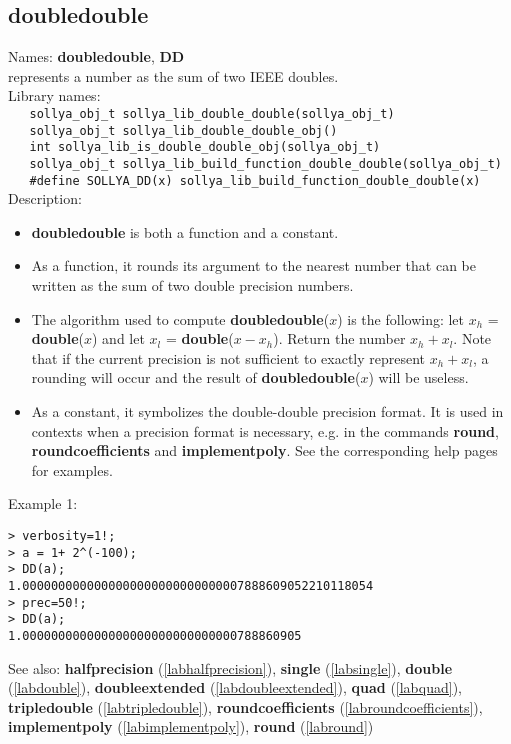 \subsection{doubledouble}
\label{labdoubledouble}
\noindent Names: \textbf{doubledouble}, \textbf{DD}\\
\phantom{aaa}represents a number as the sum of two IEEE doubles.\\[0.2cm]
\noindent Library names:\\
\verb|   sollya_obj_t sollya_lib_double_double(sollya_obj_t)|\\
\verb|   sollya_obj_t sollya_lib_double_double_obj()|\\
\verb|   int sollya_lib_is_double_double_obj(sollya_obj_t)|\\
\verb|   sollya_obj_t sollya_lib_build_function_double_double(sollya_obj_t)|\\
\verb|   #define SOLLYA_DD(x) sollya_lib_build_function_double_double(x)|\\[0.2cm]
\noindent Description: \begin{itemize}

\item \textbf{doubledouble} is both a function and a constant.

\item As a function, it rounds its argument to the nearest number that can be written
   as the sum of two double precision numbers.

\item The algorithm used to compute \textbf{doubledouble}($x$) is the following: let $x_h$ = \textbf{double}($x$)
   and let $x_l$ = \textbf{double}($x-x_h$). Return the number $x_h+x_l$. Note that if the current 
   precision is not sufficient to exactly represent $x_h + x_l$, a rounding will occur
   and the result of \textbf{doubledouble}($x$) will be useless.

\item As a constant, it symbolizes the double-double precision format. It is used in 
   contexts when a precision format is necessary, e.g. in the commands 
   \textbf{round}, \textbf{roundcoefficients} and \textbf{implementpoly}.
   See the corresponding help pages for examples.
\end{itemize}
\noindent Example 1: 
\begin{center}\begin{minipage}{15cm}\begin{Verbatim}[frame=single,commandchars=\\\|\~]
> verbosity=1!;
> a = 1+ 2^(-100);
> DD(a);
1.0000000000000000000000000000007888609052210118054
> prec=50!;
> DD(a);
1.000000000000000000000000000000788860905
\end{Verbatim}
\end{minipage}\end{center}
See also: \textbf{halfprecision} (\ref{labhalfprecision}), \textbf{single} (\ref{labsingle}), \textbf{double} (\ref{labdouble}), \textbf{doubleextended} (\ref{labdoubleextended}), \textbf{quad} (\ref{labquad}), \textbf{tripledouble} (\ref{labtripledouble}), \textbf{roundcoefficients} (\ref{labroundcoefficients}), \textbf{implementpoly} (\ref{labimplementpoly}), \textbf{round} (\ref{labround})
